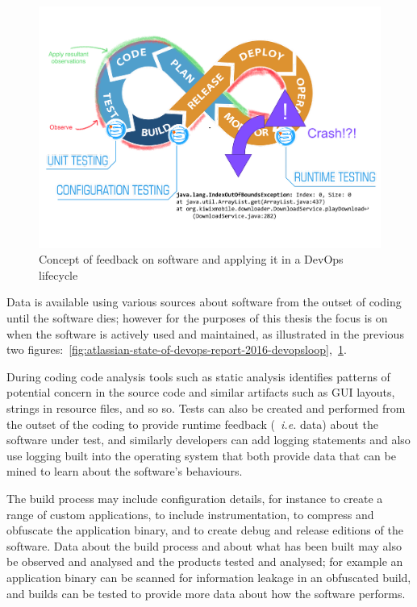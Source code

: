 \begin{figure}
    \includegraphics[width=\linewidth]{images/icst-2020/annotated-crash-reproduction.pdf}
    \caption[Concept of applying feedback on software in DevOps]{Concept of feedback on software and applying it in a DevOps lifecycle}
    \label{fig:oberve-and-apply-devops-loop}
\end{figure}

Data is available using various sources about software from the outset of coding until the software dies; however for the purposes of this thesis the focus is on when the software is actively used and maintained, as illustrated in the previous two figures:~\ref{fig:atlassian-state-of-devops-report-2016-devopsloop},~\ref{fig:oberve-and-apply-devops-loop}. 

During coding code analysis tools such as static analysis identifies patterns of potential concern in the source code and similar artifacts such as GUI layouts, strings in resource files, and so so. Tests can also be created and performed from the outset of the coding to provide runtime feedback (~\emph{i.e.} data) about the software under test, and similarly developers can add logging statements and also use logging built into the operating system that both provide data that can be mined to learn about the software's behaviours.

The build process may include configuration details, for instance to create a range of custom applications, to include instrumentation, to compress and obfuscate the application binary, and to create debug and release editions of the software. Data about the build process and about what has been built may also be observed and analysed and the products tested and analysed; for example an application binary can be scanned for information leakage in an obfuscated build, and builds can be tested to provide more data about how the software performs.

